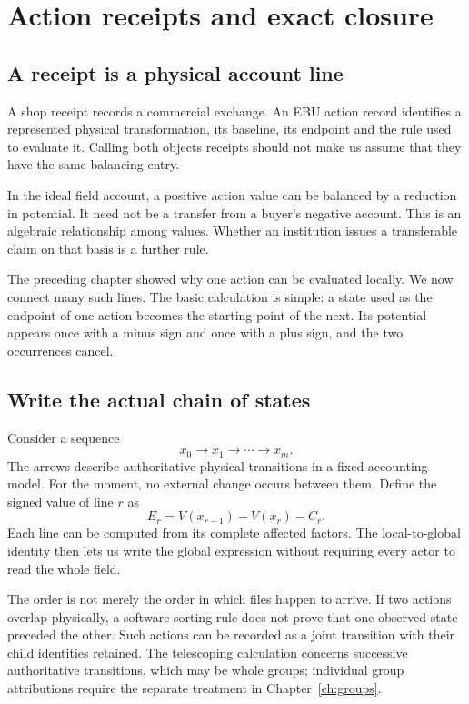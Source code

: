 \chapter{Action receipts and exact closure}\label{ch:receipts}

\section{A receipt is a physical account line}
A shop receipt records a commercial exchange. An EBU action record identifies a represented physical transformation, its baseline, its endpoint and the rule used to evaluate it. Calling both objects receipts should not make us assume that they have the same balancing entry.

In the ideal field account, a positive action value can be balanced by a reduction in potential. It need not be a transfer from a buyer's negative account. This is an algebraic relationship among values. Whether an institution issues a transferable claim on that basis is a further rule.

The preceding chapter showed why one action can be evaluated locally. We now connect many such lines. The basic calculation is simple: a state used as the endpoint of one action becomes the starting point of the next. Its potential appears once with a minus sign and once with a plus sign, and the two occurrences cancel.

\section{Write the actual chain of states}
Consider a sequence
\begin{equation}
 x_0\longrightarrow x_1\longrightarrow\cdots\longrightarrow x_m.
\end{equation}
The arrows describe authoritative physical transitions in a fixed accounting model. For the moment, no external change occurs between them. Define the signed value of line $r$ as
\begin{equation}
 E_r=V(x_{r-1})-V(x_r)-C_r.
\end{equation}
Each line can be computed from its complete affected factors. The local-to-global identity then lets us write the global expression without requiring every actor to read the whole field.

The order is not merely the order in which files happen to arrive. If two actions overlap physically, a software sorting rule does not prove that one observed state preceded the other. Such actions can be recorded as a joint transition with their child identities retained. The telescoping calculation concerns successive authoritative transitions, which may be whole groups; individual group attributions require the separate treatment in Chapter~\ref{ch:groups}.

